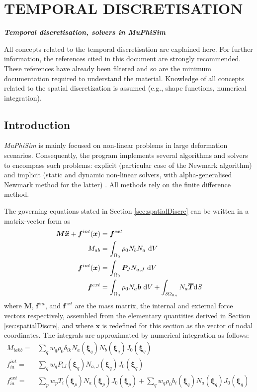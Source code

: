 \documentclass[oneside,11pt,times]{book}
\begin{document}
\section{TEMPORAL DISCRETISATION}
\begin{center}
    \Large{\textbf{\textit{Temporal discretisation, solvers in MuPhiSim}}}\\[2mm]
\end{center}


All concepts related to the temporal discretisation are explained here. For further information, the references cited in this document are strongly recommended. These references have already been filtered and so are the minimum documentation required to understand the material. Knowledge of all concepts related to the spatial discretization is assumed (e.g., shape functions, numerical integration).

\subsection{Introduction}
\textit{MuPhiSim} is mainly focused on non-linear problems in large deformation scenarios. Consequently, the program implements several algorithms and solvers to encompass such problems: explicit (particular case of the Newmark algorithm) and implicit (static and dynamic non-linear solvers, with alpha-generalised Newmark method for the latter) \cite{belytschko:1998, geradin:1997}. All methods rely on the finite difference method.

The governing equations stated in Section \ref{sec:spatialDiscre} can be written in a matrix-vector form as
\begin{equation}
\begin{aligned}
\centering
\bm{M} \bm{\ddot{x}} + \bm{f}^{int}(\bm{x})&=\bm{f}^{ext}\\
{M}_{ab}&=\int_{\Omega_0} \rho_0 N_b N_a\ \text{d}V\\
\bm{f}^{int}(\bm{x}) &= \int_{\Omega_0}\bm{P}_J N_{a,J}\ \text{d}V\\
\bm{f}^{ext} &=  \int_{\Omega_0} \rho_0 N_a \bm{b} \ \text{d}V +\int_{\delta\Omega_{0n}} N_a \overline{\bm{T}}\text{d}S
\end{aligned}
\label{equationGlobalWeakForm2}
\end{equation}
where $\bm{M}$, $\bm{f}^{int}$, and $\bm{f}^{ext}$ are the  mass matrix, the internal and external force vectors respectively, assembled from the elementary quantities derived in Section \ref{sec:spatialDiscre}, and where $\bm{x}$ is redefined for this section as the vector of nodal coordinates. The integrals are approximated by numerical integration as follows:
\begin{eqnarray}
M_{iakb} =& \sum_q w_q \rho_0 \delta_{ik} N_{a}(\bm{\xi}_q) N_{b}(\bm{\xi}_q) J_0(\bm{\xi}_q) & \label{eq:Meab1} \\
f_{ia}^{int} =& \sum_q w_q  P_{iJ}(\bm{\xi}_q) N_{a,J}(\bm{\xi}_q) J_0(\bm{\xi}_q)  & \label{eq:finte2} \label{eq:Meab2}\\
f_{ia}^{ext} =& \sum_p w_p T_{i}(\bm{\xi}_p) N_{a}(\bm{\xi}_p)  J_0(\bm{\xi}_p)+\sum_q w_q \rho_0 b_{i}(\bm{\xi}_q) N_{a}(\bm{\xi}_q)  J_0(\bm{\xi}_q) \label{eq:Meab3}&
\end{eqnarray}
\end{document}
